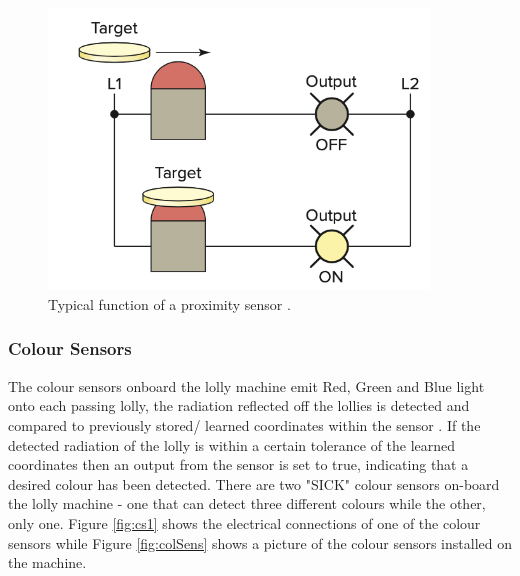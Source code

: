 \begin{figure}[H]
\begin{minipage}{0.35\textwidth}
        \includegraphics[width = 0.9\textwidth]{2_images/proxSens.png}
        \caption{Typical function of a proximity sensor \cite{petruzella2017programmable}.}
        \label{fig:proxSens}
    \end{minipage}\hfill 
    \end{figure}
    
    \subsubsection{Colour Sensors}
        The colour sensors onboard the lolly machine emit Red, Green and Blue light onto each passing lolly, the radiation reflected off the lollies is detected and compared to previously stored/ learned coordinates within the sensor \cite{sickColourSenors}. If the detected radiation of the lolly is within a certain tolerance of the learned coordinates then an output from the sensor is set to true, indicating that a desired colour has been detected. There are two "SICK" colour sensors on-board the lolly machine - one that can detect three different colours while the other, only one.
        Figure \ref{fig:cs1} shows the electrical connections of one of the colour sensors while Figure \ref{fig:colSens} shows a picture of the colour sensors installed on the machine.

